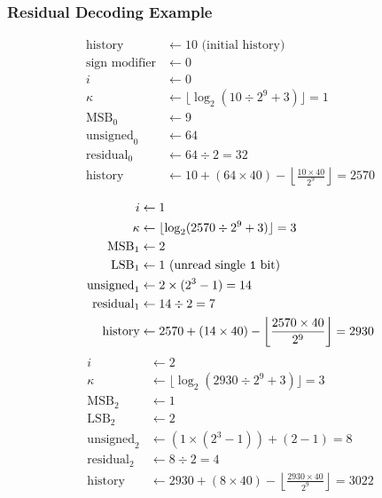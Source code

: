 \clearpage

\subsubsection{Residual Decoding Example}
{
\begin{align*}
\text{history} &\leftarrow 10 \text{ (initial history)} \\
\text{sign modifier} & \leftarrow 0 \\
i &\leftarrow 0 \\
\kappa & \leftarrow \lfloor\log_2(10 \div 2 ^ 9 + 3)\rfloor = 1 \\
\text{MSB}_0 &\leftarrow 9 \\
\text{unsigned}_0 &\leftarrow 64 \\
\text{residual}_0 &\leftarrow 64 \div 2 = 32 \\
\text{history} &\leftarrow 10 + (64 \times 40) - \left\lfloor\frac{10 \times 40}{2 ^ 9}\right\rfloor = 2570 \\
\end{align*}
\begin{align*}
i &\leftarrow 1 \\
\kappa &\leftarrow \lfloor\log_2(2570 \div 2 ^ 9 + 3)\rfloor = 3 \\
\text{MSB}_1 &\leftarrow 2 \\
\text{LSB}_1 &\leftarrow 1 \text{ (unread single \texttt{1} bit)}\\
\text{unsigned}_1 &\leftarrow 2 \times (2 ^ 3 - 1) = 14 \\
\text{residual}_1 &\leftarrow 14 \div 2 = 7 \\
\text{history} &\leftarrow 2570 + (14 \times 40) - \left\lfloor\frac{2570 \times 40}{2 ^ 9}\right\rfloor = 2930 \\
\end{align*}
\begin{align*}
i &\leftarrow 2 \\
\kappa &\leftarrow \lfloor\log_2(2930 \div 2 ^ 9 + 3)\rfloor = 3 \\
\text{MSB}_2 &\leftarrow 1 \\
\text{LSB}_2 &\leftarrow 2 \\
\text{unsigned}_2 &\leftarrow (1 \times (2 ^ 3 - 1)) + (2 - 1) = 8 \\
\text{residual}_2 &\leftarrow 8 \div 2 = 4 \\
\text{history} &\leftarrow 2930 + (8 \times 40) - \left\lfloor\frac{2930 \times 40}{2 ^ 9}\right\rfloor = 3022 \\

\end{align*}}
